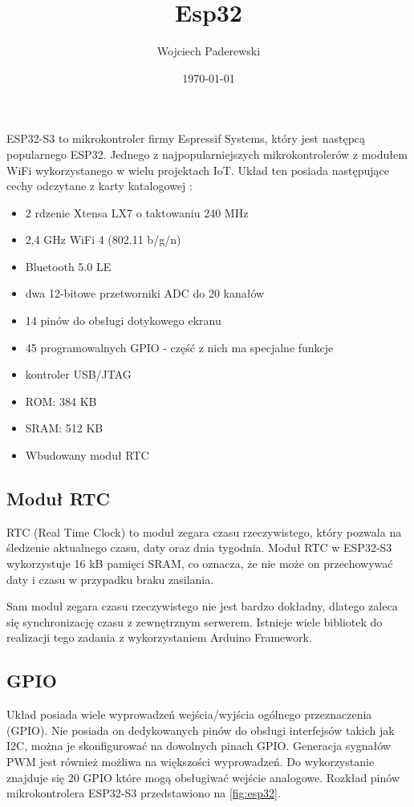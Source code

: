 \documentclass[../main.tex]{subfiles}
\author{Wojciech Paderewski}
\date{\today}
\title{Esp32}
\begin{document}
ESP32-S3 to mikrokontroler firmy Espressif Systems, który jest następcą popularnego ESP32.
Jednego z najpopularniejszych mikrokontrolerów z modułem WiFi wykorzystanego w wielu projektach IoT.
Układ ten posiada następujące cechy odczytane z karty katalogowej \cite{st:esp32}:

\begin{itemize}
\item 2 rdzenie Xtensa LX7 o taktowaniu 240 MHz
\item 2,4 GHz WiFi 4 (802.11 b/g/n)
\item Bluetooth 5.0 LE
\item dwa 12-bitowe przetworniki ADC do 20 kanałów
\item 14 pinów do obsługi dotykowego ekranu
\item 45 programowalnych GPIO - część z nich ma specjalne funkcje
\item kontroler USB/JTAG
\item ROM: 384 KB
\item SRAM: 512 KB
\item Wbudowany moduł RTC
\end{itemize}
\subsection{Moduł RTC}

RTC (Real Time Clock) to moduł zegara czasu rzeczywistego, który pozwala na śledzenie aktualnego czasu, daty oraz dnia tygodnia.
Moduł RTC w ESP32-S3 wykorzystuje 16 kB pamięci SRAM, co oznacza, że nie może on przechowywać daty i czasu w przypadku braku zasilania.

Sam moduł zegara czasu rzeczywistego nie jest bardzo dokładny, dlatego zaleca się synchronizację czasu z zewnętrznym serwerem.
Istnieje wiele bibliotek do realizacji tego zadania z wykorzystaniem Arduino Framework.
\subsection{GPIO}
Układ posiada wiele wyprowadzeń wejścia/wyjścia ogólnego przeznaczenia (GPIO). Nie posiada on dedykowanych pinów do obsługi interfejsów takich jak I2C, można 
je skonfigurować na dowolnych pinach GPIO. Generacja sygnałów PWM jest również możliwa na większości wyprowadzeń. Do wykorzystanie znajduje się 20 GPIO które mogą
obsługiwać wejście analogowe. Rozkład pinów mikrokontrolera ESP32-S3 przedstawiono na \ref{fig:esp32}.
\end{document}
